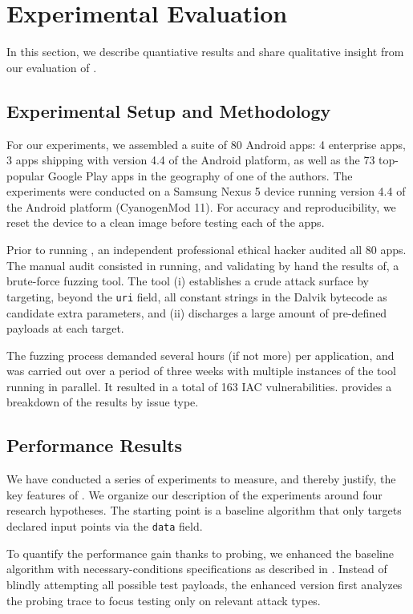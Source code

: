\section{Experimental Evaluation}\label{Se:evaluation}

In this section, we describe quantiative results and share qualitative insight from our evaluation of \Tool. 

\subsection{Experimental Setup and Methodology}

For our experiments, we assembled a suite of 80 Android apps: 4 enterprise apps, 3 apps shipping with version 4.4 of the Android platform, as well as the 73 top-popular Google Play apps in the geography of one of the authors.
The experiments were conducted on a Samsung Nexus 5 device running version 4.4 of the Android platform (CyanogenMod 11). For accuracy and reproducibility, we reset the device to a clean image before testing each of the apps.

Prior to running \Tool, an independent professional ethical hacker audited all 80 apps. The manual audit consisted in running, and validating by hand the results of, a brute-force fuzzing tool. The tool (i) establishes a crude attack surface by targeting, beyond the {\tt uri} field, all constant strings in the Dalvik bytecode as candidate extra parameters, and (ii) discharges a large amount of pre-defined payloads at each target.

The fuzzing process demanded several hours (if not more) per application, and was carried out over a period of three weeks with multiple instances of the tool running in parallel. It resulted in a total of 163 IAC vulnerabilities.  provides a breakdown of the results by issue type.

\subsection{Performance Results}

We have conducted a series of experiments to measure, and thereby justify, the key features of \Tool. We organize our description of the experiments around four research hypotheses. The starting point is a baseline algorithm that only targets declared input points via the {\tt data} field.

 To quantify the performance gain thanks to probing, we enhanced the baseline algorithm with necessary-conditions specifications as described in . Instead of blindly attempting all possible test payloads, the enhanced version first analyzes the probing trace to focus testing only on relevant attack types.

